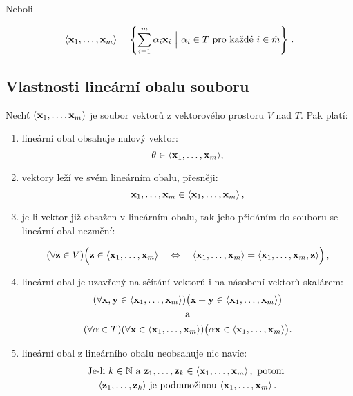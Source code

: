 \noindent Neboli

\[ \langle  \mathbf{x}_{1},\dots,\mathbf{x}_{m}  \rangle = \left\{\sum_{i=1}^m \alpha_i \mathbf{x}_i \ \Big|\ \alpha_i\in T \text{ pro každé }i \in \hat m \right\}\,. \]

\subsection*{Vlastnosti lineární obalu souboru}

Nechť $(\mathbf{x}_1,\ldots,\mathbf{x}_m)$ je soubor vektorů z vektorového prostoru $V$ nad
$T$. Pak platí:

\begin{enumerate}
    \item lineární obal obsahuje nulový vektor:
          \[ \theta\in \langle \mathbf{x}_1,\ldots,\mathbf{x}_m \rangle , \]
    \item vektory leží ve svém lineárním obalu, přesněji:
          \[ \mathbf{x}_1,\ldots,\mathbf{x}_m  \in  \langle \mathbf{x}_1,\ldots,\mathbf{x}_m \rangle\,, \]
    \item je-li vektor již obsažen v lineárním obalu, tak jeho přidáním do souboru se
          lineární obal nezmění:

          \[ (\forall \mathbf{z}\in V)\Big(\mathbf{z}\in\langle \mathbf{x}_1,\ldots,\mathbf{x}_m \rangle   \quad \Leftrightarrow \quad \langle  \mathbf{x}_1,\ldots,\mathbf{x}_m  \rangle =\langle  \mathbf{x}_1,\ldots,\mathbf{x}_m,\mathbf{z}  \rangle\Big)\,, \]

    \item lineární obal je uzavřený na sčítání vektorů i na násobení vektorů skalárem:
          \begin{gather*}
              (\forall\mathbf{x},\mathbf{y}\in\langle  \mathbf{x}_1,\ldots,\mathbf{x}_m \rangle)\big(\mathbf{x}+\mathbf{y}\in\langle \mathbf{x}_1,\ldots,\mathbf{x}_m \rangle\big)\\
              \quad\text{a}\quad\\
              (\forall\alpha\in T)(\forall\mathbf{x}\in\langle \mathbf{x}_1,\ldots,\mathbf{x}_m \rangle)\big(\alpha \mathbf{x}\in\langle \mathbf{x}_1,\ldots,\mathbf{x}_m \rangle\big) .
          \end{gather*}
    \item lineární obal z lineárního obalu neobsahuje nic navíc:
          \begin{gather*}
              \text{Je-li } k\in \mathbb{N} \text{ a } \mathbf{z}_1,\dots, \mathbf{z}_k\in\langle  \mathbf{x}_1,\ldots,\mathbf{x}_m \rangle\,,\text{ potom }\\
              \langle  \mathbf{z}_1,\ldots,\mathbf{z}_k  \rangle \text{ je podmnožinou } \langle  \mathbf{x}_1,\ldots,\mathbf{x}_m \rangle\,.
          \end{gather*}
\end{enumerate}
